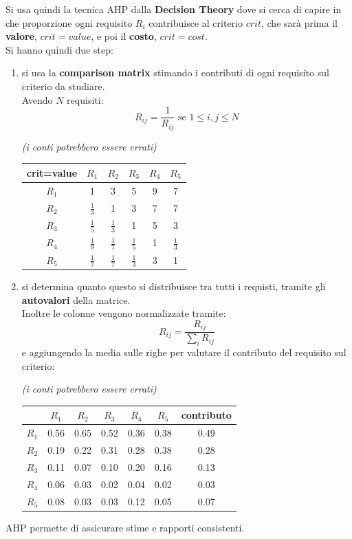 \documentclass[a4paper,12pt, oneside]{book}
\begin{document}
Si usa quindi la tecnica AHP dalla \textbf{Decision Theory} dove si cerca di
capire in che proporzione ogni requisito $R_i$ contribuisce al criterio $crit$,
che sarà prima il \textbf{valore}, $crit=value$, e poi il \textbf{costo},
$crit=cost$.\\
Si hanno quindi due step:
\begin{enumerate}
  \item si usa la \textbf{comparison matrix} stimando i contributi di ogni
  requisito sul criterio da studiare.\\
  Avendo $N$ requisiti:
  \[R_{ij}=\frac{1}{R_{ij}}\mbox{ se } 1\leq i,j\leq N\]
  \begin{esempio}
    \textit{(i conti potrebbero essere errati)}
    \begin{table}[H]
      \centering
      \begin{tabular}{c||c|c|c|c|c}
        crit=value & $R_1$ & $R_2$& $R_3$ & $R_4$ & $R_5$\\
        \hline
        $R_1$ &1 & 3 & 5 & 9 & 7\\
        $R_2$ & $\frac{1}{3}$ & 1 & 3 & 7 & 7\\
        $R_3$ & $\frac{1}{5}$ & $\frac{1}{3}$ & 1 & 5 & 3\\
        $R_4$ & $\frac{1}{9}$ & $\frac{1}{7}$ & $\frac{1}{5}$ & 1 &$\frac{1}{3}$\\
        $R_5$ &  $\frac{1}{7}$ & $\frac{1}{7}$ & $\frac{1}{3}$ & 3 & 1
      \end{tabular}
    \end{table}
  \end{esempio}
  \item si determina quanto questo si distribuisce
  tra tutti i requisti, tramite gli \textbf{autovalori} della matrice.\\
  Inoltre le colonne vengono normalizzate tramite:
  \[R_{ij}=\frac{R_{ij}}{\sum_i R_{ij}}\]
  \newpage
  e aggiungendo la media sulle righe per valutare il contributo del requisito
  sul criterio:
  \begin{esempio}
    \textit{(i conti potrebbero essere errati)}
    \begin{table}[H]
      \centering
      \begin{tabular}{c||c|c|c|c|c||c}
        & $R_1$ & $R_2$& $R_3$ & $R_4$ & $R_5$ & contributo\\
        \hline
        $R_1$ & 0.56 & 0.65 & 0.52 & 0.36 & 0.38 & 0.49\\
        $R_2$ & 0.19 & 0.22 & 0.31 & 0.28 & 0.38 & 0.28\\
        $R_3$ & 0.11 & 0.07 & 0.10 & 0.20 & 0.16 & 0.13\\
        $R_4$ & 0.06 & 0.03 & 0.02 & 0.04 & 0.02 & 0.03\\
        $R_5$ & 0.08 & 0.03 & 0.03 & 0.12 & 0.05 & 0.07
      \end{tabular}
    \end{table}
  \end{esempio}
\end{enumerate}
AHP permette di assicurare stime e rapporti consistenti.
\end{document}
